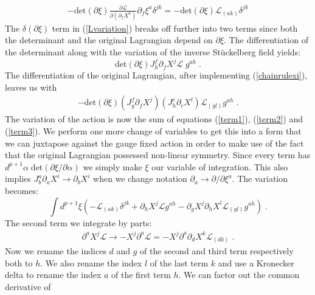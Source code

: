 \documentclass[%
 reprint,
 amsmath,amssymb,
 aps,
]{revtex4-1}
\begin{document}
\begin{eqnarray}
    -\mathrm{det}(\partial \xi)
    \frac{\partial \mathcal{L} }{\partial \left(  \partial_f X^k \right)} \partial_f \xi^a \delta^{j k}
    =
    -\mathrm{det} ( \partial \xi ) \mathcal{L}_{(a k)} \delta^{j k}
\label{term1}
\end{eqnarray}
The $\delta (\partial\xi)$ term in (\ref{Lvariation}) breaks off further into two terms since both the determinant and the original
Lagrangian depend on $\partial \xi$. The differentiation of the determinant along with the variation of the inverse
St\"uckelberg field yields:
\begin{equation}
\label{term2}
    \mathrm{det} ( \partial \xi ) J^f_h \partial_f X^j \mathcal{L} \; g^{a h} \; .
\end{equation}
The differentiation of the original Lagrangian, after implementing (\ref{chainrulexi}), leaves us with
\begin{eqnarray}
\label{term3}
    - \mathrm{det} ( \partial \xi ) ( J^f_g \partial_f X^j )
    ( J^c_h \partial_{c} X^l ) \mathcal{L}_{(g l)} g^{a h} \; .
\end{eqnarray}
The variation of the action is now the sum of equations (\ref{term1}), (\ref{term2}) and (\ref{term3}).  We perform one more change
of variables to get this into a form that we can juxtapose against the gauge fixed action in order to
make use of the fact that the original Lagrangian possessed non-linear symmetry.  Since
every term has $d^{p+1} \alpha\;\mathrm{det}\left( \partial \xi/\partial \alpha\right)$ we simply make $\xi$
our variable of integration. This also implies $J^a_b \partial_a X^i \rightarrow \partial_b X^i$ when we change notation $\partial_a \rightarrow \partial/\partial \xi^a$.
The variation becomes:
\begin{equation}
\label{diffeq}
    \int d^{p+1} \xi \left(
    -\mathcal{L}_{(a k)} \delta^{j k}
    + \partial_h X^j \mathcal{L} g^{a h}
    - \partial_g X^j \partial_h X^l \mathcal{L}_{(g l)} g^{a h} \right) \; .
\end{equation}
The second term we integrate by parts:
\begin{gather}
    \partial^a X^j \mathcal{L} \rightarrow
    - X^j \partial^a \mathcal{L} = - X^j \partial^a \partial_d X^k \mathcal{L}_{(d k)} \; . \nonumber
\end{gather}
Now we rename the indices $d$ and $g$ of the second and third term respectively both to $h$. We also
rename the index $l$ of the last term $k$ and use a Kronecker delta to rename the index
$a$ of the first term $h$. We can factor out the common derivative of
\end{document}
